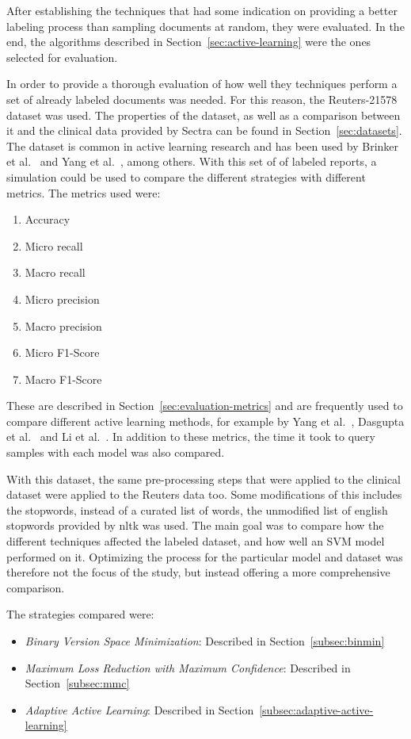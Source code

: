 After establishing the techniques that had some indication on providing a better labeling process than sampling documents at random, they were evaluated.
In the end, the algorithms described in Section~\ref{sec:active-learning} were the ones selected for evaluation.

In order to provide a thorough evaluation of how well they techniques perform a set of already labeled documents was needed.
For this reason, the Reuters-21578 dataset was used.
The properties of the dataset, as well as a comparison between it and the clinical data provided by Sectra can be found in Section~\ref{sec:datasets}.
The dataset is common in active learning research and has been used by Brinker et al\@.~\cite{brinker2006active} and Yang et al\@.~\cite{yang2009effective}, among others.
With this set of of labeled reports, a simulation could be used to compare the different strategies with different metrics.
The metrics used were:
\begin{enumerate}
    \item Accuracy
    \item Micro recall
    \item Macro recall
    \item Micro precision
    \item Macro precision
    \item Micro F1-Score
    \item Macro F1-Score
\end{enumerate}

These are described in Section~\ref{sec:evaluation-metrics} and are frequently used to compare different active learning methods, for example by Yang et al\@.~\cite{yang2009effective}, Dasgupta et al\@.~\cite{dasgupta2008hierarchical} and Li et al\@.~\cite{li2013active}.
In addition to these metrics, the time it took to query samples with each model was also compared.

With this dataset, the same pre-processing steps that were applied to the clinical dataset were applied to the Reuters data too.
Some modifications of this includes the stopwords, instead of a curated list of words, the unmodified list of english stopwords provided by nltk was used.
The main goal was to compare how the different techniques affected the labeled dataset, and how well an SVM model performed on it.
Optimizing the process for the particular model and dataset was therefore not the focus of the study, but instead offering a more comprehensive comparison.

The strategies compared were: 
\begin{itemize}
    \item \textit{Binary Version Space Minimization}: Described in Section~\ref{subsec:binmin}
    \item \textit{Maximum Loss Reduction with Maximum Confidence}: Described in Section~\ref{subsec:mmc}
    \item \textit{Adaptive Active Learning}: Described in Section~\ref{subsec:adaptive-active-learning}
\end{itemize}

